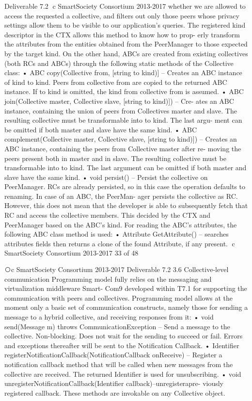 Deliverable 7.2 ⃝c SmartSociety Consortium 2013-2017
whether we are allowed to access the requested a collective, and filters out only those peers whose privacy settings allow them to be visible to our application’s queries. The registered kind descriptor in the CTX allows this method to know how to prop- erly transform the attributes from the entities obtained from the PeerManager to those expected by the target kind.
On the other hand, ABCs are created from existing collectives (both RCs and ABCs) through the following static methods of the Collective class:
• ABC copy(Collective from, [string to kind)] – Creates an ABC instance of kind to kind. Peers from collective from are copied to the returned ABC instance. If to kind is omitted, the kind from collective from is assumed.
• ABC join(Collective master, Collective slave, [string to kind)]) – Cre- ates an ABC instance, containing the union of peers from Collectives master and slave. The resulting collective must be transformable into to kind. The last argu- ment can be omitted if both master and slave have the same kind.
• ABC complement(Collective master, Collective slave, [string to kind)]) – Creates an ABC instance, containing the peers from Collective master after re- moving the peers present both in master and in slave. The resulting collective must be transformable into to kind. The last argument can be omitted if both master and slave have the same kind.
• void persist() – Persist the collective on PeerManager. RCs are already persisted, so in this case the operation defaults to renaming. In case of an ABC, the PeerMan- ager persists the collective as RC. However, this does not mean that the developer is able to subsequently fetch that RC and access the collective members. This decided by the CTX and PeerManager based on the ABC’s kind.
For reading the ABC’s attributes, the following ABC class method is used:
• Attribute GetAttribute() – searches attributes fields then returns a clone of the
found Attribute, if any present.
⃝c SmartSociety Consortium 2013-2017 33 of 48
        
⃝c SmartSociety Consortium 2013-2017 Deliverable 7.2
3.6 Collective-level communication
Programming model fully relies on the messaging and virtualization middleware Smart- Com9 developed within T7.1 for supporting the communication with peers and collectives. Programming model allows at the moment only a basic set of communication constructs, namely those for sending a message to a hybrid collective, and receiving responses from it:
• void send(Message m) throws CommunicationException – Send a message to the collective. Non-blocking. Does not wait for the sending to succeed or fail. Errors and exceptions thereafter will be sent to the Notification Callback.
• Identifier registerNotificationCallback(NotificationCallback onReceive) – Register a notification callback method that will be called when new messages from the collective are received. The returned Identifier is used for unsubscribing.
• void unregisterNotificationCallback(Identifier callback)–unregisterapre- viously registered callback.
These methods are invokable on any Collective object.



